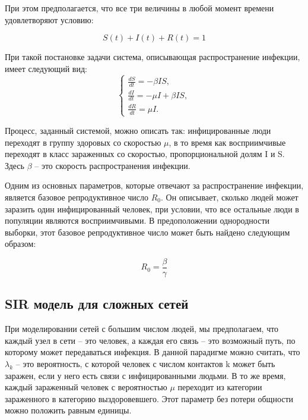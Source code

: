 \documentclass[14pt,a4paper]{article}
\begin{document}
При этом предполагается, что все три величины в любой момент времени удовлетворяют условию:

\begin{equation}
	S(t) + I(t) + R(t) = 1
	\label{eq:norm}
\end{equation}

При такой постановке задачи система, описывающая распространение инфекции, имеет следующий вид:
\begin{equation}
	\begin{cases}
		\frac{d S}{d t} = -\beta  I S, \\
		\frac{d I}{d t} = -\mu I + \beta  I S, \\
		\frac{d R}{d t} = \mu I .
	\end{cases}
	\label{eq:SIR_system_base}
\end{equation}

Процесс, заданный системой, можно описать так:  инфицированные люди переходят в группу здоровых со скоростью $\mu$, в то время как восприимчивые переходят в класс зараженных со скоростью, пропорциональной долям I и S. Здесь $\beta$ -- это скорость распространения инфекции.
 
Одним из основных параметров, которые отвечают за распространение инфекции, является базовое репродуктивное число $R_0$. Он описывает, сколько людей может заразить один инфицированный человек, при условии, что все остальные люди в популяции являются восприимчивыми. В предоположении однородности выборки, этот базовое репродуктивное число может быть найдено следующим образом:

\begin{equation}
	R_0 = \frac{\beta}{\gamma}
\end{equation}


\subsection{SIR модель для сложных сетей}

При моделировании сетей с большим числом людей, мы предполагаем, что каждый узел в сети -- это человек, а каждая его связь -- это возможный путь, по которому может передаваться инфекция. В данной парадигме можно считать, что $\lambda_k$ -- это вероятность, с которой человек с числом контактов k может быть заражен, если у него есть связи с инфицированными людьми. В то же время, каждый зараженный человек с вероятностью $\mu$ переходит из категории зараженного в категорию выздоровевшего. Этот параметр без потери общности можно положить равным единицы.
\end{document}

